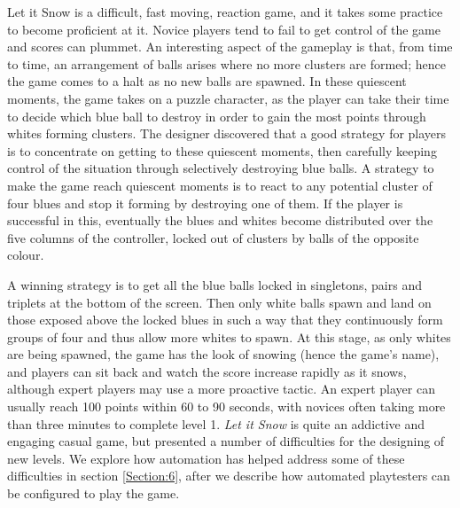 \documentclass{IEEEtran}
\begin{document}
Let it Snow is a difficult, fast moving, reaction game, and it takes some practice to become proficient at it. Novice players tend to fail to get control of the game and scores can plummet. An interesting aspect of the gameplay is that, from time to time, an arrangement of balls arises where no more clusters are formed; hence the game comes to a halt as no new balls are spawned. In these quiescent moments, the game takes on a puzzle character, as the player can take their time to decide which blue ball to destroy in order to gain the most points through whites forming clusters. The designer discovered that a good strategy for players is to concentrate on getting to these quiescent moments, then carefully keeping control of the situation through selectively destroying blue balls. A strategy to make the game reach quiescent moments is to react to any potential cluster of four blues and stop it forming by destroying one of them. If the player is successful in this, eventually the blues and whites become distributed over the five columns of the controller, locked out of clusters by balls of the opposite colour.

A winning strategy is to get all the blue balls locked in singletons, pairs and triplets at the bottom of the screen. Then only white balls spawn and land on those exposed above the locked blues in such a way that they continuously form groups of four and thus allow more whites to spawn. At this stage, as only whites are being spawned, the game has the look of snowing (hence the game's name), and players can sit back and watch the score increase rapidly as it snows, although expert players may use a more proactive tactic. An expert player can usually reach 100 points within 60 to 90 seconds, with novices often taking more than three minutes to complete level 1. \emph{Let it Snow} is quite an addictive and engaging casual game, but presented a number of difficulties for the designing of new levels. We explore how automation has helped address some of these difficulties in section \ref{Section:6}, after we describe how automated playtesters can be configured to play the game.
\end{document}

